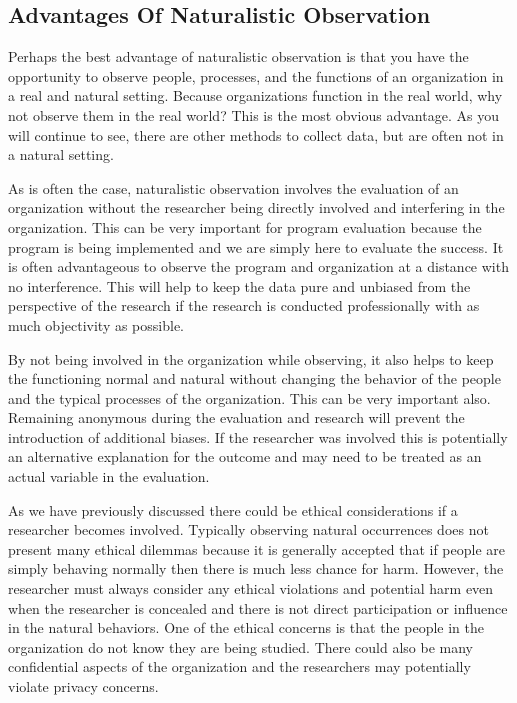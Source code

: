 \documentclass[]{book}
\theoremstyle{definition}
\theoremstyle{definition}
\theoremstyle{definition}
\theoremstyle{remark}
\begin{document}
\hypertarget{advantages-of-naturalistic-observation}{%
\subsection{Advantages Of Naturalistic
Observation}\label{advantages-of-naturalistic-observation}}

Perhaps the best advantage of naturalistic observation is that you have
the opportunity to observe people, processes, and the functions of an
organization in a real and natural setting. Because organizations
function in the real world, why not observe them in the real world? This
is the most obvious advantage. As you will continue to see, there are
other methods to collect data, but are often not in a natural setting.

As is often the case, naturalistic observation involves the evaluation
of an organization without the researcher being directly involved and
interfering in the organization. This can be very important for program
evaluation because the program is being implemented and we are simply
here to evaluate the success. It is often advantageous to observe the
program and organization at a distance with no interference. This will
help to keep the data pure and unbiased from the perspective of the
research if the research is conducted professionally with as much
objectivity as possible.

By not being involved in the organization while observing, it also helps
to keep the functioning normal and natural without changing the behavior
of the people and the typical processes of the organization. This can be
very important also. Remaining anonymous during the evaluation and
research will prevent the introduction of additional biases. If the
researcher was involved this is potentially an alternative explanation
for the outcome and may need to be treated as an actual variable in the
evaluation.

As we have previously discussed there could be ethical considerations if
a researcher becomes involved. Typically observing natural occurrences
does not present many ethical dilemmas because it is generally accepted
that if people are simply behaving normally then there is much less
chance for harm. However, the researcher must always consider any
ethical violations and potential harm even when the researcher is
concealed and there is not direct participation or influence in the
natural behaviors. One of the ethical concerns is that the people in the
organization do not know they are being studied. There could also be
many confidential aspects of the organization and the researchers may
potentially violate privacy concerns.
\end{document}
